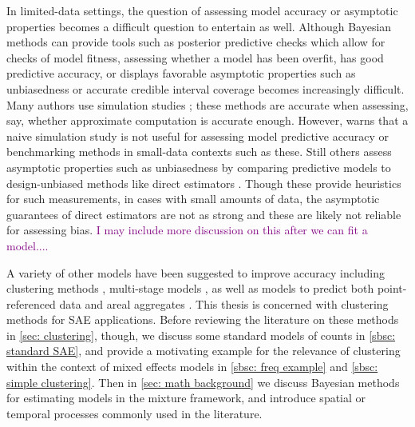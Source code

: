 \documentclass[twoside,12pt,bibstyle=chem-acs]{reedthesis}
\begin{document}

In limited-data settings, the question of assessing model accuracy or asymptotic properties becomes a difficult question to entertain as well. Although Bayesian methods can provide tools such as posterior predictive checks which allow for checks of model fitness, assessing whether a model has been overfit, has good predictive accuracy, or displays favorable asymptotic properties such as unbiasedness or accurate credible interval coverage becomes increasingly difficult. Many authors use simulation studies \cite{bhattacharyya_bayesian_2026, wehrhahn_bayesian_2020, vanhatalo_spatiotemporal_2021}; these methods are accurate when assessing, say, whether approximate computation is accurate enough. However, \citeauthor{dorfman_towards_2018} warns that a naive simulation study is not useful for assessing model predictive accuracy or benchmarking methods in small-data contexts such as these. Still others assess asymptotic properties such as unbiasedness by comparing predictive models to design-unbiased methods like direct estimators \cite{white_hierarchical_2021,ver_planck_hierarchical_2018}. Though these provide heuristics for such measurements, in cases with small amounts of data, the asymptotic guarantees of direct estimators are not as strong and these are likely not reliable for assessing bias. \textcolor{purple}{I may include more discussion on this after we can fit a model....}

A variety of other models have been suggested to improve accuracy including clustering methods \cite{bhattacharyya_bayesian_2026}, multi-stage models \cite{white_hierarchical_2026, balocchi_crime_2023}, as well as models to predict both point-referenced data and areal aggregates \cite{dettmann_review_2022}. This thesis is concerned with clustering methods for SAE applications. Before reviewing the literature on these methods in \autoref{sec: clustering}, though, we discuss some standard models of counts in \autoref{sbsc: standard SAE}, and provide a motivating example for the relevance of clustering within the context of mixed effects models in \autoref{sbsc: freq example} and \autoref{sbsc: simple clustering}. Then in \autoref{sec: math background} we discuss Bayesian methods for estimating models in the mixture framework, and introduce spatial or temporal processes commonly used in the literature.
\end{document}
